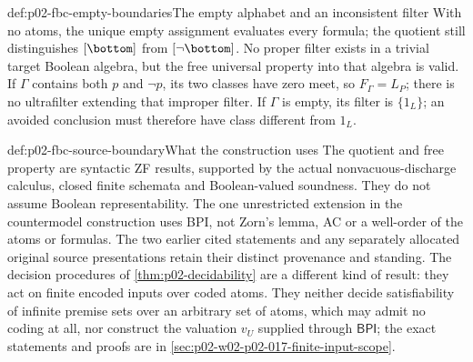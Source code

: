 \begin{hbexample}{def:p02-fbc-empty-boundaries}{The empty alphabet and an inconsistent filter}
With no atoms, the unique empty assignment evaluates every formula;
the quotient still distinguishes \([\bottom]\) from \([\neg\bottom]\).
No proper filter exists in a trivial target Boolean algebra, but the
free universal property into that algebra is valid.
If \(\Gamma\) contains both \(p\) and \(\neg p\), its two classes have
zero meet, so \(F_\Gamma=L_P\); there is no ultrafilter extending that
improper filter. If \(\Gamma\) is empty, its filter is \(\{1_L\}\);
an avoided conclusion must therefore have class different from \(1_L\).
\end{hbexample}

\begin{proofboundary}{def:p02-fbc-source-boundary}{What the construction uses}
The quotient and free property are syntactic ZF results, supported by
the actual nonvacuous-discharge calculus, closed finite schemata and
Boolean-valued soundness. They do not assume Boolean representability.
The one unrestricted extension in the countermodel construction uses BPI,
not Zorn's lemma, AC or a well-order of the atoms or formulas.
The two earlier cited statements and any separately allocated original
source presentations retain their distinct provenance and standing.
The decision procedures of \cref{thm:p02-decidability} are a different
kind of result: they act on finite encoded inputs over coded atoms.
They neither decide satisfiability of infinite premise sets over an
arbitrary set of atoms, which may admit no coding at all, nor construct
the valuation \(v_U\) supplied through \(\mathsf{BPI}\); the exact
statements and proofs are in \cref{sec:p02-w02-p02-017-finite-input-scope}.
\end{proofboundary}

